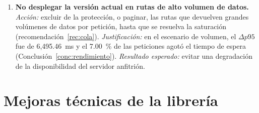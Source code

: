 \begin{enumerate}
    \item \textbf{No desplegar la versión actual en rutas de alto volumen de datos.}
    \textit{Acción:} excluir de la protección, o paginar, las rutas que devuelven grandes volúmenes
    de datos por petición, hasta que se resuelva la saturación (recomendación~\ref{rec:cola}).
    \textit{Justificación:} en el escenario de volumen, el $\Delta p95$ fue de 6{,}495.46~ms y el
    7.00~\% de las peticiones agotó el tiempo de espera (Conclusión~\ref{conc:rendimiento}).
    \textit{Resultado esperado:} evitar una degradación de la disponibilidad del servidor anfitrión.
\end{enumerate}

\section{Mejoras técnicas de la librería}

